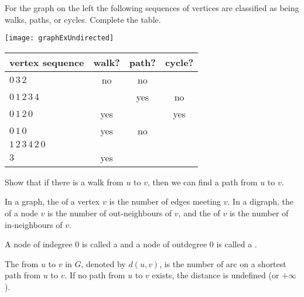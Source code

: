 \begin{Boxample}
For the graph on the left the following
sequences of vertices are classified as being walks, paths, or cycles. Complete the table.

\begin{minipage}[c]{0.3\textwidth}
\centering
\texttt{[image: graphExUndirected]}
\end{minipage}
\begin{minipage}[c]{0.65\textwidth}
\begin{tabular}{|l|c|c|c|}\hline
\textbf{vertex sequence} & \textbf{walk?} & \textbf{path?} & \textbf{cycle?} \\ \hline
$0\, 3\, 2$                  & no  & no  &   \\
$0\, 1\, 2\, 3\, 4$          &     & yes & no  \\
$0\, 1\,  2\,  0$            & yes &     & yes  \\
$0 \, 1\,  0$                & yes & no  &  \\
$1\,  2\,  3\,  4\,  2\,  0$ &     &     &  \\
$3$							 & yes &     &  \\
\hline
\end{tabular}
\end{minipage}
\end{Boxample}

\begin{Boxample}[7]
Show that if there is a walk from $u$ to $v$, then we can find a path from $u$ to $v$.
\end{Boxample}

\begin{Definition} 
In a graph, the  of a vertex $v$ is the number of edges meeting $v$. 
In a digraph, the  of a node $v$ is the number of out-neighbours of $v$, 
and the  of $v$ is the number of in-neighbours of $v$.

A node of indegree $0$ is called a  and a node of outdegree $0$ is called a .
\end{Definition}


\begin{Definition}
The  from $u$ to $v$ in $G$, denoted by $d(u,v)$, is 
the number of arc on a shortest path from $u$ to $v$. If no path from $u$ to $v$ exists, the 
distance is undefined (or $+\infty$).
\end{Definition}

